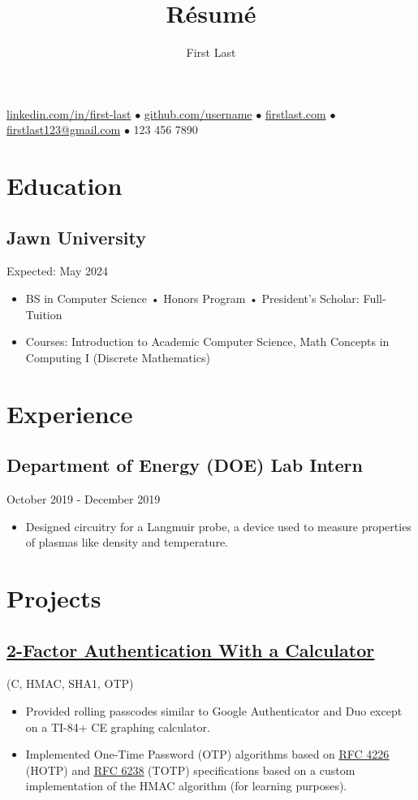\documentclass{article}
\makeatletter
\renewcommand{\maketitle}{
    \begin{center}
        {\huge\bfseries
        \theauthor}
    \end{center}
    \begin{center}
        \vspace{1em}
        \leavevmode
        \href{https://youtu.be/DLzxrzFCyOs}{linkedin.com/in/first-last} $\bullet$ \href{https://youtu.be/DLzxrzFCyOs}{github.com/username} $\bullet$ \href{https://youtu.be/DLzxrzFCyOs}{firstlast.com} $\bullet$ \href{https://youtu.be/DLzxrzFCyOs}{firstlast123@gmail.com} $\bullet$ 123 456 7890
    \end{center}
}
\makeatother
\begin{document}
\title{R\'esum\'e}
\author{First Last}

\maketitle
\section{Education}
\subsection{Jawn University} \hfill Expected: May 2024
\begin{itemize}
    \item BS in Computer Science • Honors Program • President's Scholar: Full-Tuition
    \item Courses: Introduction to Academic Computer Science, Math Concepts in Computing I (Discrete Mathematics)
\end{itemize}

\section{Experience}
\subsection{Department of Energy (DOE) Lab Intern}\hfill October 2019 - December 2019
\begin{itemize}
    \item Designed circuitry for a Langmuir probe, a device used to measure properties of plasmas like density and temperature.
\end{itemize}

\section{Projects}
\subsection{\href{https://youtu.be/DLzxrzFCyOs}{\underline{2-Factor Authentication With a Calculator}}} \hfill (C, HMAC, SHA1, OTP)
\begin{itemize}
    \item Provided rolling passcodes similar to Google Authenticator and Duo except on a TI-84+ CE graphing calculator.
    \item Implemented One-Time Password (OTP) algorithms based on \href{https://tools.ietf.org/html/rfc4226}{\underline{RFC 4226}} (HOTP) and \href{https://tools.ietf.org/html/rfc6238}{\underline{RFC 6238}} (TOTP) specifications based on a custom implementation of the HMAC algorithm (for learning purposes).
\end{itemize}
\end{document}
